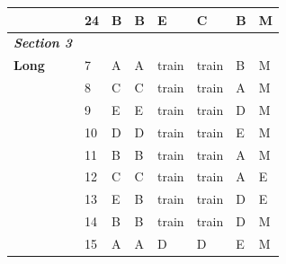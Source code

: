\documentclass[pageno]{final_paper}
\newcommand{\textbi}[1]{\textbf{\textit{#1}}}
\begin{document}
\begin{table}[]
\begin{tabular}{llllllll}
\textbf{}                & 24              & B                       & B                      & E                       & C                       & B                       & M                   \\ \midrule
\textbi{Section 3}       &                 &                         &                        &                         &                         &                         &                     \\ \midrule
\textbf{Long}            & 7               & A                       & A                      & train                   & train                   & B                       & M                   \\
\textbf{}                & 8               & C                       & C                      & train                   & train                   & A                       & M                   \\
\textbf{}                & 9               & E                       & E                      & train                   & train                   & D                       & M                   \\
\textbf{}                & 10              & D                       & D                      & train                   & train                   & E                       & M                   \\
\textbf{}                & 11              & B                       & B                      & train                   & train                   & A                       & M                   \\
\textbf{}                & 12              & C                       & C                      & train                   & train                   & A                       & E                   \\
\textbf{}                & 13              & E                       & B                      & train                   & train                   & D                       & E                   \\
\textbf{}                & 14              & B                       & B                      & train                   & train                   & D                       & M                   \\
\textbf{}                & 15              & A                       & A                      & D                       & D                       & E                       & M                   \\

\end{tabular}
\end{table}
\end{document}
